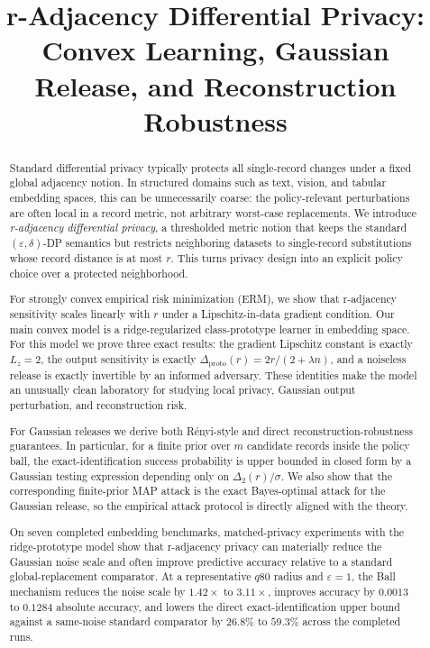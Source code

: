 \documentclass[conference,compsoc]{IEEEtran}
\title{r-Adjacency Differential Privacy:\\Convex Learning, Gaussian Release, and Reconstruction Robustness}
\author{}
\begin{document}
\maketitle

\begin{abstract}
Standard differential privacy typically protects all single-record changes under a fixed global adjacency notion. In structured domains such as text, vision, and tabular embedding spaces, this can be unnecessarily coarse: the policy-relevant perturbations are often local in a record metric, not arbitrary worst-case replacements. We introduce \emph{r-adjacency differential privacy}, a thresholded metric notion that keeps the standard $(\varepsilon,\delta)$-DP semantics but restricts neighboring datasets to single-record substitutions whose record distance is at most $r$. This turns privacy design into an explicit policy choice over a protected neighborhood.

For strongly convex empirical risk minimization (ERM), we show that r-adjacency sensitivity scales linearly with $r$ under a Lipschitz-in-data gradient condition. Our main convex model is a ridge-regularized class-prototype learner in embedding space. For this model we prove three exact results: the gradient Lipschitz constant is exactly $L_z=2$, the output sensitivity is exactly $\Delta_{\mathrm{proto}}(r)=2r/(2+\lambda n)$, and a noiseless release is exactly invertible by an informed adversary. These identities make the model an unusually clean laboratory for studying local privacy, Gaussian output perturbation, and reconstruction risk.

For Gaussian releases we derive both Rényi-style and direct reconstruction-robustness guarantees. In particular, for a finite prior over $m$ candidate records inside the policy ball, the exact-identification success probability is upper bounded in closed form by a Gaussian testing expression depending only on $\Delta_2(r)/\sigma$. We also show that the corresponding finite-prior MAP attack is the exact Bayes-optimal attack for the Gaussian release, so the empirical attack protocol is directly aligned with the theory.

On seven completed embedding benchmarks, matched-privacy experiments with the ridge-prototype model show that r-adjacency privacy can materially reduce the Gaussian noise scale and often improve predictive accuracy relative to a standard global-replacement comparator. At a representative $q80$ radius and $\varepsilon=1$, the Ball mechanism reduces the noise scale by $1.42\times$ to $3.11\times$, improves accuracy by $0.0013$ to $0.1284$ absolute accuracy, and lowers the direct exact-identification upper bound against a same-noise standard comparator by $26.8\%$ to $59.3\%$ across the completed runs.
\end{abstract}
\end{document}
